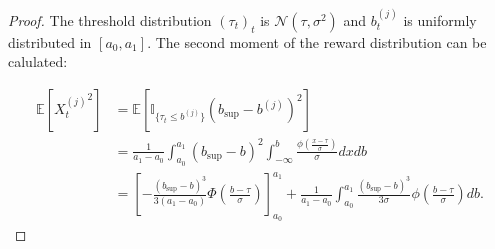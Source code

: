 \documentclass{statsmsc}
\begin{document}
\begin{proof} The threshold distribution $(\tau_t)_t$ is $\mathcal{N}(\tau, \sigma^2)$ and $b_t^{(j)}$ is uniformly distributed in $\left[ a_0, a_1\right]$.
  The second moment of the reward distribution can be calulated:

  \begin{align*}
    \mathbb{E}\left[{X_t^{(j)}}^2\right] &= \mathbb{E}[\mathbb{I}_{\{\tau_t \leq b^{(j)}\}}(b_{\sup}-b^{(j)})^2] \\
    & = \frac{1}{a_1 - a_0}\int_{a_0}^{a_1} (b_{\sup}-b)^2 \int_{-\infty}^{b} \frac{\phi\left(\frac{x - \tau}{\sigma}\right)}{\sigma} dx db \\
    & = \left[- \frac{(b_{\sup}-b)^3}{3 (a_1 - a_0)} \Phi\left(\frac{b - \tau}{\sigma}\right) \right]_{a_0}^{a_1} + \frac{1}{a_1 - a_0}\int_{a_0}^{a_1}  \frac{(b_{\sup}-b)^3}{3 \sigma} \phi\left(\frac{b - \tau}{\sigma}\right)db.
  \end{align*}
  

\end{proof}
\end{document}
